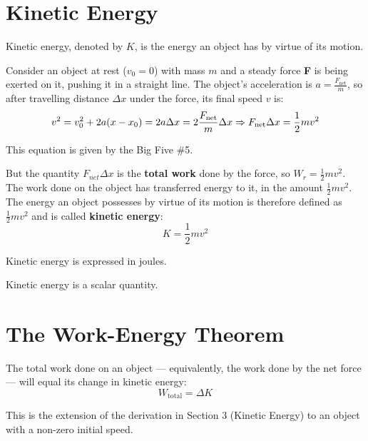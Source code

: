 \documentclass{article}
\begin{document}
\section{Kinetic Energy}
\begin{definition}
    Kinetic energy, denoted by $K$, is the energy an object has by virtue of its motion.
\end{definition}
Consider an object at rest ($v_{0} = 0$) with mass $m$ and a steady force \textbf{F} is being exerted on it, pushing it in a straight line. The object's acceleration is $a = \frac{F_{\text{net}}}{m}$, so after travelling distance $\Delta x$ under the force, its final speed $v$ is:
\begin{equation*}
    v^{2} = v_{0}^2 + 2a(x-x_{0})=2a \Delta x = 2 \frac{F_{\text{net}}}{m} \Delta x \space \Rightarrow \space F_{\text{net}} \Delta x = \frac{1}{2}mv^{2}
\end{equation*}
\begin{note}
    This equation is given by the Big Five \#5.
\end{note}
But the quantity $F_{net} \Delta x$ is the \textbf{total work} done by the force, so $W_{r} = \frac{1}{2}mv^{2}$. The work done on the object has transferred energy to it, in the amount $\frac{1}{2}mv^{2}$. \\
The energy an object possesses by  virtue of its motion is therefore defined as $\frac{1}{2}mv^{2}$ and is called \textbf{kinetic energy}:
\begin{equation*}
    K = \frac{1}{2}mv^{2}
\end{equation*}
\begin{unit}
    Kinetic energy is expressed in joules.
\end{unit}
\begin{note}
    Kinetic energy is a scalar quantity.
\end{note}

\newpage
\section{The Work-Energy Theorem}
\begin{theorem}
    The total work done on an object --- equivalently, the work done by the net force --- will equal its change in kinetic energy:
    \begin{equation*}
        W_{\text{total}} = \Delta K
    \end{equation*}
    \begin{note}
        This is the extension of the derivation in Section 3 (Kinetic Energy) to an object with a non-zero initial speed.
    \end{note}
\end{theorem}
\end{document}
